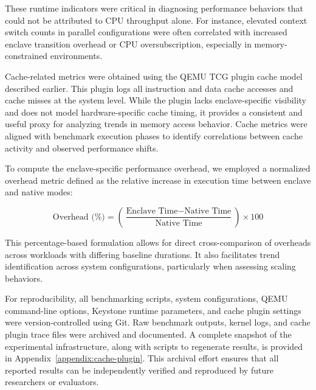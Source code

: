 These runtime indicators were critical in diagnosing performance behaviors that could not be attributed to CPU throughput alone. For instance, elevated context switch counts in parallel configurations were often correlated with increased enclave transition overhead or CPU oversubscription, especially in memory-constrained environments.

Cache-related metrics were obtained using the QEMU TCG plugin cache model described earlier. This plugin logs all instruction and data cache accesses and cache misses at the system level. While the plugin lacks enclave-specific visibility and does not model hardware-specific cache timing, it provides a consistent and useful proxy for analyzing trends in memory access behavior. Cache metrics were aligned with benchmark execution phases to identify correlations between cache activity and observed performance shifts.

To compute the enclave-specific performance overhead, we employed a normalized overhead metric defined as the relative increase in execution time between enclave and native modes:

\[
\text{Overhead (\%)} = \left( \frac{\text{Enclave Time} - \text{Native Time}}{\text{Native Time}} \right) \times 100
\]

This percentage-based formulation allows for direct cross-comparison of overheads across workloads with differing baseline durations. It also facilitates trend identification across system configurations, particularly when assessing scaling behaviors.

For reproducibility, all benchmarking scripts, system configurations, QEMU command-line options, Keystone runtime parameters, and cache plugin settings were version-controlled using Git. Raw benchmark outputs, kernel logs, and cache plugin trace files were archived and documented. A complete snapshot of the experimental infrastructure, along with scripts to regenerate results, is provided in Appendix~\ref{appendix:cache-plugin}. This archival effort ensures that all reported results can be independently verified and reproduced by future researchers or evaluators.
